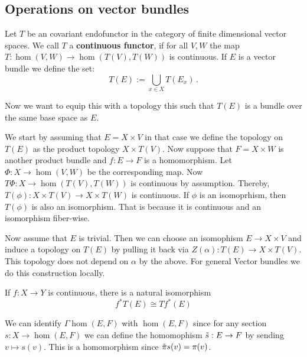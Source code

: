 \subsection{Operations on vector bundles}
\begin{definition}
	Let $T$ be an covariant endofunctor in the category of finite dimensional vector spaces. We call $T$ a \textbf{continuous functor}, if for all $V,W$ the map $T:\hom(V,W)\to \hom(T(V),T(W))$ is continuous. If $E$  is a vector bundle we define the set:
	\begin{equation*}
		T(E):=\bigcup_{x\in X}T(E_x)\,.
	\end{equation*} 
\end{definition}
Now we want to equip this with a topology this such that $T(E)$ is a bundle over the same base space as $E$.
\begin{definition}\label{def: Constructing new bundles}
	We start by assuming that $E=X\times V$ in that case we define the topology on $T(E)$ as the product topology $X\times T(V)$. Now suppose that $F=X\times W$ is another product bundle and $f:E\to F$ is a homomorphism. Let $\Phi: X \to \hom(V,W)$ be the corresponding map. Now $T\Phi: X\to \hom(T(V),T(W))$ is continuous by assumption. Thereby, $T(\phi):X\times T(V)\to X\times T(W)$ is continuous. If $\phi$ is an isomoprhism, then $T(\phi)$ is also an isomorphism. That is because it is continuous and an isomorphism fiber-wise.
	
	Now assume that $E$ is trivial. Then we can choose an isomophism $E\to X\times V$ and induce a topology on $T(E)$ by pulling it back via $Z(\alpha):T(E)\to X\times T(V)$. This topology does not depend on $\alpha$ by the above. 
	For general Vector bundles we do this construction locally. 
	
	If $f:X\to Y$ is continuous, there is a natural isomorphism
	\begin{equation*}
		f^*T(E)\cong Tf^*(E)
	\end{equation*}
\end{definition}
\begin{cor}\label{cor: sections into hom(E,F) = hom(E,F)}
	We can identify $\Gamma \hom(E,F)$ with $\hom(E,F)$ since for any section $s:X\to \hom(E,F)$ we can define the homomophism $\Tilde{s}:E\to F$ by sending $v\mapsto s(v)$. This is a homomorphism since $\Tilde{\pi}s(v)=\pi(v)$. 
\end{cor}
